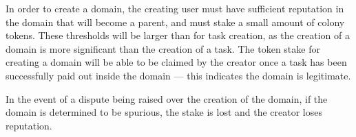 In order to create a domain, the creating user must have sufficient reputation in the domain that will become a parent, and must stake a small amount of colony tokens. These thresholds will be larger than for task creation, as the creation of a domain is more significant than the creation of a task. The token stake for creating a domain will be able to be claimed by the creator once a task has been successfully paid out inside the domain --- this indicates the domain is legitimate.

In the event of a dispute being raised over the creation of the domain, if the domain is determined to be spurious, the stake is lost and the creator loses reputation.

